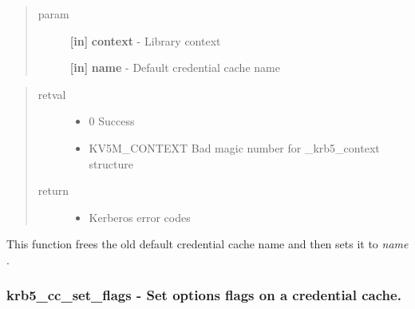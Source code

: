 \documentclass[letterpaper,10pt,english]{sphinxmanual}
\begin{document}
\begin{fulllineitems}
\label{appdev/refs/api/krb5_cc_set_default_name:krb5_cc_set_default_name}
\end{fulllineitems}

\begin{quote}\begin{description}
\item[{param}] \leavevmode
\textbf{{[}in{]}} \textbf{context} - Library context

\textbf{{[}in{]}} \textbf{name} - Default credential cache name

\end{description}\end{quote}
\begin{quote}\begin{description}
\item[{retval}] \leavevmode\begin{itemize}
\item {} 
0   Success

\item {} 
KV5M\_CONTEXT   Bad magic number for \_krb5\_context structure

\end{itemize}

\item[{return}] \leavevmode\begin{itemize}
\item {} 
Kerberos error codes

\end{itemize}

\end{description}\end{quote}

This function frees the old default credential cache name and then sets it to \emph{name} .


\subsubsection{krb5\_cc\_set\_flags -  Set options flags on a credential cache.}
\label{appdev/refs/api/krb5_cc_set_flags:krb5-cc-set-flags-set-options-flags-on-a-credential-cache}\label{appdev/refs/api/krb5_cc_set_flags::doc}
\end{document}
